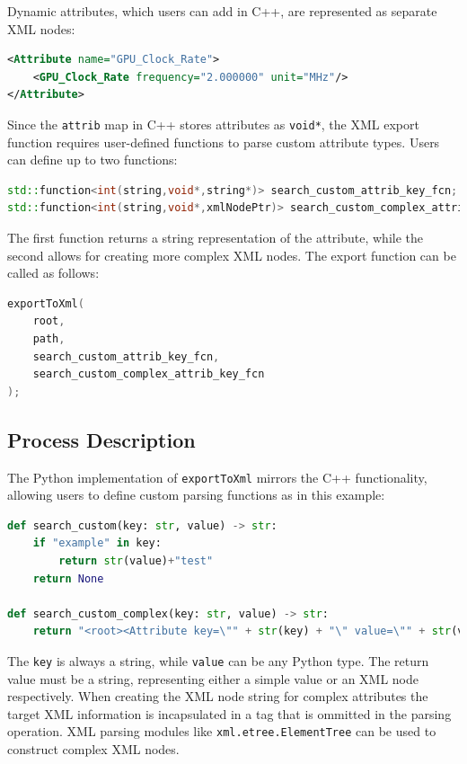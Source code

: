 Dynamic attributes, which users can add in C++, are represented as separate XML nodes:

\begin{lstlisting}[language=xml, xleftmargin=4em, frame = single]
<Attribute name="GPU_Clock_Rate">
    <GPU_Clock_Rate frequency="2.000000" unit="MHz"/>
</Attribute>
\end{lstlisting}

Since the \verb|attrib| map in C++ stores attributes as \verb|void*|, the XML export function requires user-defined functions to parse custom attribute types. Users can define up to two functions:

\begin{lstlisting}[language=C++, xleftmargin=4em, frame = single]
std::function<int(string,void*,string*)> search_custom_attrib_key_fcn;
std::function<int(string,void*,xmlNodePtr)> search_custom_complex_attrib_key_fcn;
\end{lstlisting}

The first function returns a string representation of the attribute, while the second allows for creating more complex XML nodes. The export function can be called as follows:

\begin{lstlisting}[language=C++, xleftmargin=4em, frame = single]
exportToXml(
    root, 
    path, 
    search_custom_attrib_key_fcn, 
    search_custom_complex_attrib_key_fcn
);
\end{lstlisting}

\subsection{Process Description}

The Python implementation of \verb|exportToXml| mirrors the C++ functionality, allowing users to define custom parsing functions as in this example:

\begin{lstlisting}[language=Python, xleftmargin=4em, frame = single]
def search_custom(key: str, value) -> str:
    if "example" in key:
        return str(value)+"test"
    return None

def search_custom_complex(key: str, value) -> str:
    return "<root><Attribute key=\"" + str(key) + "\" value=\"" + str(value) + "\"/><root>"
\end{lstlisting}

The \verb|key| is always a string, while \verb|value| can be any Python type. The return value must be a string, representing either a simple value or an XML node respectively. When creating the XML node string for complex attributes the target XML information is incapsulated in a tag that is ommitted in the parsing operation. XML parsing modules like \verb|xml.etree.ElementTree|\cite{xml-etree} can be used to construct complex XML nodes.

